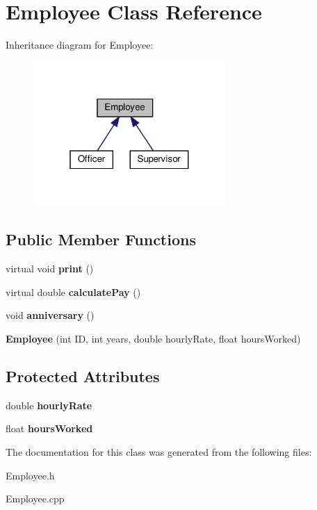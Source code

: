 \hypertarget{classEmployee}{}\section{Employee Class Reference}
\label{classEmployee}


Inheritance diagram for Employee\+:
\nopagebreak
\begin{figure}[H]
\begin{center}
\leavevmode
\includegraphics[width=208pt]{classEmployee__inherit__graph}
\end{center}
\end{figure}
\subsection*{Public Member Functions}
\begin{DoxyCompactItemize}
\item 
\mbox{\label{classEmployee_a79556ad700627dba88049f487a34a762}} 
virtual void {\bfseries print} ()
\item 
\mbox{\label{classEmployee_a01c2c44e15434237db28832f6972e960}} 
virtual double {\bfseries calculate\+Pay} ()
\item 
\mbox{\label{classEmployee_a67c345031cf63f515fb09dc675dee5f3}} 
void {\bfseries anniversary} ()
\item 
\mbox{\label{classEmployee_ad0c935ef9a290a82dcf7865172c90148}} 
{\bfseries Employee} (int ID, int years, double hourly\+Rate, float hours\+Worked)
\end{DoxyCompactItemize}
\subsection*{Protected Attributes}
\begin{DoxyCompactItemize}
\item 
\mbox{\label{classEmployee_ac31134abb9b4004fc015e51ef579b069}} 
double {\bfseries hourly\+Rate}
\item 
\mbox{\label{classEmployee_afde35c73d02eb1cfe89e23a80998b42e}} 
float {\bfseries hours\+Worked}
\end{DoxyCompactItemize}


The documentation for this class was generated from the following files\+:\begin{DoxyCompactItemize}
\item 
Employee.\+h\item 
Employee.\+cpp\end{DoxyCompactItemize}
